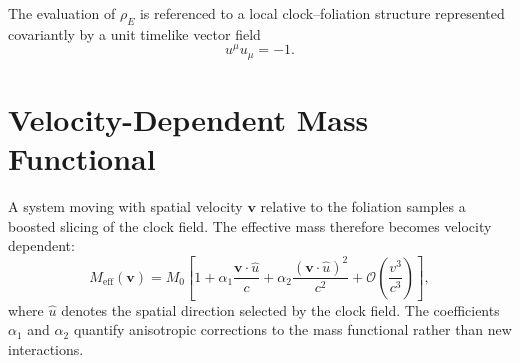 \documentclass[11pt]{article}
\begin{document}
        The evaluation of $\rho_{\!E}$ is referenced to a local clock--foliation structure
        represented covariantly by a unit timelike vector field
        \begin{equation}
            u^\mu u_\mu = -1 .
        \end{equation}

    \section{Velocity-Dependent Mass Functional}

        A system moving with spatial velocity $\mathbf{v}$ relative to the foliation samples
        a boosted slicing of the clock field.
        The effective mass therefore becomes velocity dependent:
        \begin{equation}
            M_{\mathrm{eff}}(\mathbf{v})
            =
            M_0
            \left[
                1
                + \alpha_1 \frac{\mathbf{v}\cdot\hat{u}}{c}
                + \alpha_2 \frac{(\mathbf{v}\cdot\hat{u})^2}{c^2}
                + \mathcal{O}\!\left(\frac{v^3}{c^3}\right)
            \right],
        \end{equation}
        where $\hat{u}$ denotes the spatial direction selected by the clock field.
        The coefficients $\alpha_1$ and $\alpha_2$ quantify anisotropic corrections to the
        mass functional rather than new interactions.
\end{document}
